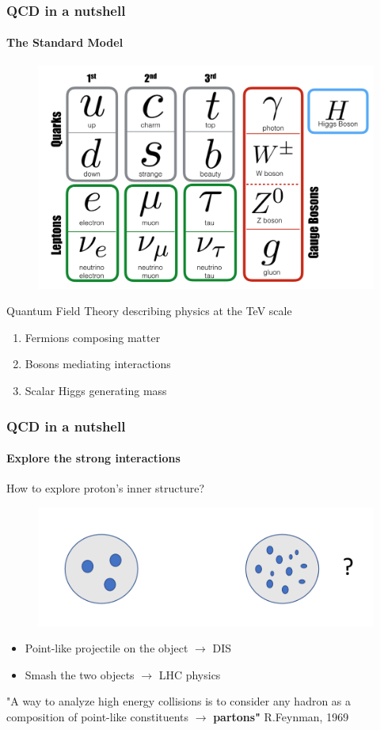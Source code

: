 \documentclass[aspectratio=43]{beamer}
\begin{document}
\begin{frame}

	\frametitle{QCD in a nutshell}
	\framesubtitle{The Standard Model}

	\begin{figure}
		\includegraphics[width = 6 cm]{plots/SM.png}
	\end{figure}
 
	
	Quantum Field Theory describing physics at the TeV scale
	\begin{enumerate}
		\item Fermions composing matter
		\item Bosons mediating interactions
		\item Scalar Higgs generating mass
	\end{enumerate}	
	
\end{frame}

\begin{frame}

	\frametitle{QCD in a nutshell}
	\framesubtitle{Explore the strong interactions}
	
	How to explore proton's inner structure?
	
	\begin{figure}
		\includegraphics[width = 0.5\linewidth]{plots/protons.png}
	\end{figure}
	
	
	\begin{itemize}
		\item Point-like projectile on the object $\longrightarrow$ DIS
		\item Smash the two objects $\longrightarrow$ LHC physics
	\end{itemize}
	
	{\color{blue}"A way to analyze high energy collisions is to consider any hadron as a composition of point-like constituents $\longrightarrow$ \textbf{partons"} } R.Feynman, 1969 

\end{frame}
\end{document}
